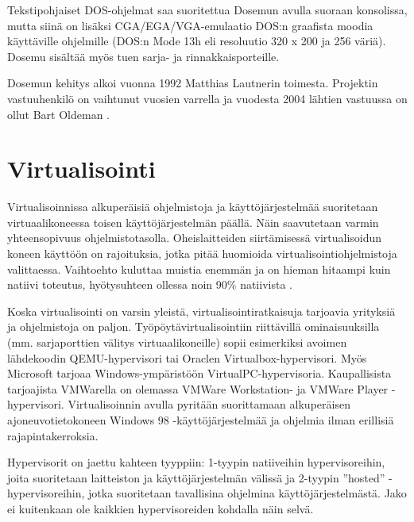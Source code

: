 Tekstipohjaiset DOS-ohjelmat saa suoritettua Dosemun avulla suoraan konsolissa, mutta siinä on lisäksi CGA/EGA/VGA-emulaatio DOS:n graafista moodia käyttäville ohjelmille (DOS:n Mode 13h eli resoluutio 320 x 200 ja 256 väriä). Dosemu sisältää myös tuen sarja- ja rinnakkaisporteille.

Dosemun kehitys alkoi vuonna 1992 Matthias Lautnerin toimesta. Projektin vastuuhenkilö on vaihtunut vuosien varrella ja vuodesta 2004 lähtien vastuussa on ollut Bart Oldeman \cite{dosemu:history}.




\section{Virtualisointi}

Virtualisoinnissa alkuperäisiä ohjelmistoja ja käyttöjärjestelmää suoritetaan virtuaalikoneessa toisen käyttöjärjestelmän päällä. Näin saavutetaan varmin yhteensopivuus ohjelmistotasolla. Oheislaitteiden siirtämisessä virtualisoidun koneen käyttöön on rajoituksia, jotka pitää huomioida virtualisointiohjelmistoja valittaessa. Vaihtoehto kuluttaa muistia enemmän ja on hieman hitaampi kuin natiivi toteutus, hyötysuhteen ollessa noin 90\%  natiivista \cite{virtnat_anadtech}.


Koska virtualisointi on varsin yleistä, virtualisointiratkaisuja tarjoavia yrityksiä ja ohjelmistoja on paljon. Työpöytävirtualisointiin riittävillä ominaisuuksilla (mm. sarjaporttien välitys virtuaalikoneille) sopii esimerkiksi avoimen lähdekoodin QEMU-hypervisori tai Oraclen Virtualbox-hypervisori. Myös Microsoft tarjoaa Windows-ympäristöön VirtualPC-hypervisoria. Kaupallisista tarjoajista VMWarella on olemassa VMWare Workstation- ja VMWare Player -hypervisori. Virtualisoinnin avulla pyritään suorittamaan alkuperäisen ajoneuvotietokoneen Windows 98 -käyttöjärjestelmää ja ohjelmia ilman erillisiä rajapintakerroksia.

Hypervisorit on jaettu kahteen tyyppiin: 1-tyypin natiiveihin hypervisoreihin, joita suoritetaan laitteiston ja käyttöjärjestelmän välissä ja 2-tyypin ''hosted'' -hypervisoreihin, jotka suoritetaan tavallisina ohjelmina käyttöjärjestelmästä. Jako ei kuitenkaan ole kaikkien hypervisoreiden kohdalla näin selvä. %



